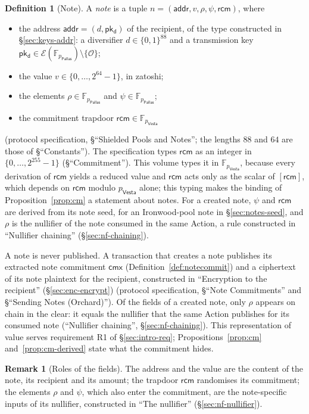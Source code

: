 \documentclass[11pt,a4paper]{article}
\theoremstyle{definition}
\newtheorem{definition}[theorem]{Definition}
\newtheorem{remark}[theorem]{Remark}
\newcommand{\F}{\mathbb{F}}
\newcommand{\cmx}{\mathsf{cmx}}
\newcommand{\Pallas}{\ensuremath{\mathsf{Pallas}}}
\newcommand{\Vesta}{\ensuremath{\mathsf{Vesta}}}
\newcommand{\Ep}{\ensuremath{\mathcal{E}}}
\newcommand{\pkd}{\ensuremath{\mathsf{pk_d}}}
\newcommand{\rcm}{\ensuremath{\mathsf{rcm}}}
\begin{document}
\begin{definition}[Note]
A \emph{note} is a tuple $n = (\mathsf{addr}, v, \rho, \psi, \rcm)$, where
\begin{itemize}
\item the address $\mathsf{addr} = (d, \pkd)$ of the recipient, of the type
  constructed in \S\ref{sec:keys-addr}: a diversifier $d \in \{0,1\}^{88}$
  and a transmission key
  $\pkd \in \Ep(\F_{p_{\Pallas}}) \setminus \{\mathcal{O}\}$;
\item the value $v \in \{0, \dots, 2^{64} - 1\}$, in zatoshi;
\item the elements $\rho \in \F_{p_{\Pallas}}$ and
  $\psi \in \F_{p_{\Pallas}}$;
\item the commitment trapdoor $\rcm \in \F_{p_{\Vesta}}$
\end{itemize}
(protocol specification, \S``Shielded Pools and Notes''; the lengths $88$
and $64$ are those of \S``Constants''). The specification types $\rcm$ as an
integer in $\{0, \dots, 2^{255} - 1\}$ (\S``Commitment''). This volume types
it in $\F_{p_{\Vesta}}$, because every derivation of $\rcm$ yields a reduced
value and $\rcm$ acts only as the scalar of $[\rcm]$, which depends on $\rcm$
modulo $p_{\Vesta}$ alone; this typing makes the binding of
Proposition~\ref{prop:cm} a statement about notes. For a created note, $\psi$
and $\rcm$ are derived from its note seed, for an Ironwood-pool note in
\S\ref{sec:notes-seed}, and $\rho$ is the nullifier of the note consumed in
the same Action, a rule constructed in ``Nullifier chaining''
(\S\ref{sec:nf-chaining}).
\end{definition}

A note is never published. A transaction that creates a note publishes its
extracted note commitment $\cmx$ (Definition~\ref{def:notecommit}) and a
ciphertext of its note plaintext for the recipient, constructed in
``Encryption to the recipient'' (\S\ref{sec:enc-encrypt}) (protocol
specification, \S``Note Commitments'' and \S``Sending Notes (Orchard)''). Of
the fields of a created note, only $\rho$ appears on chain in the clear: it
equals the nullifier that the same Action publishes for its consumed note
(``Nullifier chaining'', \S\ref{sec:nf-chaining}). This representation of
value serves requirement R1 of \S\ref{sec:intro-req};
Propositions~\ref{prop:cm} and~\ref{prop:cm-derived} state what the
commitment hides.

\begin{remark}[Roles of the fields]
The address and the value are the content of the note, its recipient and
its amount; the trapdoor $\rcm$ randomises its commitment; the elements
$\rho$ and $\psi$, which also enter the commitment, are the note-specific
inputs of its nullifier, constructed in ``The nullifier''
(\S\ref{sec:nf-nullifier}).
\end{remark}
\end{document}
